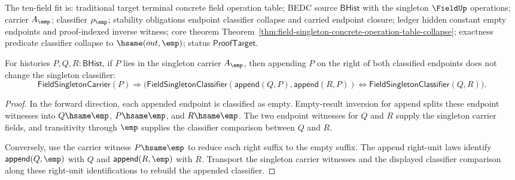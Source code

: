 The ten-field fit is: traditional target terminal concrete field operation
table; BEDC source $\mathsf{BHist}$ with the singleton $\FieldUp$ operations;
carrier $A_{\emp}$; classifier $\rho_{\emp}$; stability obligations endpoint
classifier collapse and carried endpoint closure; ledger hidden constant empty
endpoints and proof-indexed inverse witness; core theorem
Theorem~\ref{thm:field-singleton-concrete-operation-table-collapse}; exactness
predicate classifier collapse to $\hsame(out,\emp)$; status
$\mathsf{ProofTarget}$.

\begin{theorem}
\label{thm:field-singleton-classifier-append-right-cancel}
For histories $P,Q,R:\mathsf{BHist}$, if $P$ lies in the singleton carrier
$A_{\emp}$, then appending $P$ on the right of both classified endpoints does
not change the singleton classifier:
$$
\mathsf{FieldSingletonCarrier}(P)\Rightarrow
\bigl(
\mathsf{FieldSingletonClassifier}(\mathsf{append}(Q,P),\mathsf{append}(R,P))
\Longleftrightarrow
\mathsf{FieldSingletonClassifier}(Q,R)
\bigr).
$$
\end{theorem}
\begin{proof}
In the forward direction, each appended endpoint is classified as empty.
Empty-result inversion for append splits these endpoint witnesses into
$Q\hsame\emp$, $P\hsame\emp$, and $R\hsame\emp$. The two endpoint witnesses for
$Q$ and $R$ supply the singleton carrier fields, and transitivity through
$\emp$ supplies the classifier comparison between $Q$ and $R$.

Conversely, use the carrier witness $P\hsame\emp$ to reduce each right suffix
to the empty suffix. The append right-unit laws identify
$\mathsf{append}(Q,\emp)$ with $Q$ and $\mathsf{append}(R,\emp)$ with $R$.
Transport the singleton carrier witnesses and the displayed classifier
comparison along these right-unit identifications to rebuild the appended
classifier.
\end{proof}


